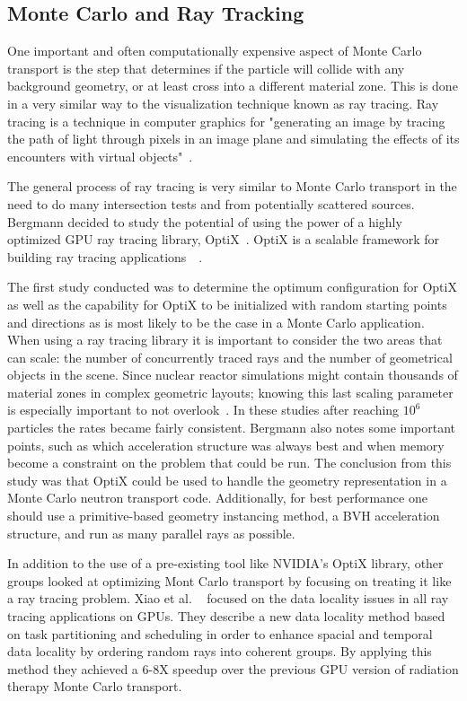 \subsection{\textbf{Monte Carlo and Ray Tracking}}

One important and often computationally expensive aspect of Monte Carlo transport is the step that determines if the particle will collide with any background geometry, or at least cross into a different material zone.
%
This is done in a very similar way to the visualization technique known as ray tracing.
%
Ray tracing is a technique in computer graphics for "generating an image by tracing the path of light through pixels in an image plane and simulating the effects of its encounters with virtual objects"~\cite{wikipediaRayTracing}.

The general process of ray tracing is very similar to Monte Carlo transport in the need to do many intersection tests and from potentially scattered sources.
%
Bergmann decided to study the potential of using the power of a highly optimized GPU ray tracing library, OptiX~\cite{2014development}.
%
OptiX is a scalable framework for building ray tracing applications~\cite{optixProgrammingGuide}~\cite{parker2010optix}.

%
The first study conducted was to determine the optimum configuration for OptiX as well as the capability for OptiX to be initialized with random starting points and directions as is most likely to be the case in a Monte Carlo application.
%
When using a ray tracing library it is important to consider the two areas that can scale: the number of concurrently traced rays and the number of geometrical objects in the scene.
%
Since nuclear reactor simulations might contain thousands of material zones in complex geometric layouts; knowing this last scaling parameter is especially important to not overlook~\cite{2014development}.
%
 In these studies after reaching $10^6$ particles the rates became fairly consistent.
 Bergmann also notes some important points, such as which acceleration structure was always best and when memory become a constraint on the problem that could be run.
 The conclusion from this study was that OptiX could be used to handle the geometry representation in a Monte Carlo neutron transport code.
 Additionally, for best performance one should use a primitive-based geometry instancing method, a BVH acceleration structure, and run as many parallel rays as possible.
%

%
In addition to the use of a pre-existing tool like NVIDIA's OptiX library, other groups looked at optimizing Mont Carlo transport by focusing on treating it like a ray tracing problem.
%
Xiao et al. ~\cite{xiao2015monte} focused on the data locality issues in all ray tracing applications on GPUs.
%
They describe a new data locality method based on task partitioning and scheduling in order to enhance spacial and temporal data locality by ordering random rays into coherent groups.
%
By applying this method they achieved a 6-8X speedup over the previous GPU version of radiation therapy Monte Carlo transport. 
%

